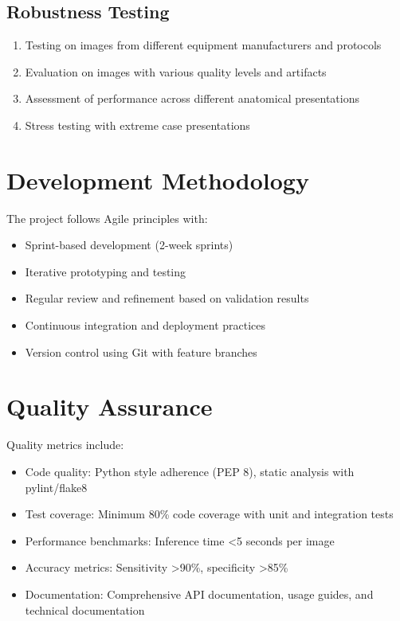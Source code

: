 {\subsection{Robustness Testing}

\begin{enumerate}
    \item Testing on images from different equipment manufacturers and protocols
    \item Evaluation on images with various quality levels and artifacts
    \item Assessment of performance across different anatomical presentations
    \item Stress testing with extreme case presentations
\end{enumerate}

\section{Development Methodology}

The project follows Agile principles with:

\begin{itemize}
    \item Sprint-based development (2-week sprints)
    \item Iterative prototyping and testing
    \item Regular review and refinement based on validation results
    \item Continuous integration and deployment practices
    \item Version control using Git with feature branches
\end{itemize}

\section{Quality Assurance}

Quality metrics include:

\begin{itemize}
    \item Code quality: Python style adherence (PEP 8), static analysis with pylint/flake8
    \item Test coverage: Minimum 80\% code coverage with unit and integration tests
    \item Performance benchmarks: Inference time \textless 5 seconds per image
    \item Accuracy metrics: Sensitivity \textgreater 90\%, specificity \textgreater 85\%
    \item Documentation: Comprehensive API documentation, usage guides, and technical documentation
\end{itemize}

}
